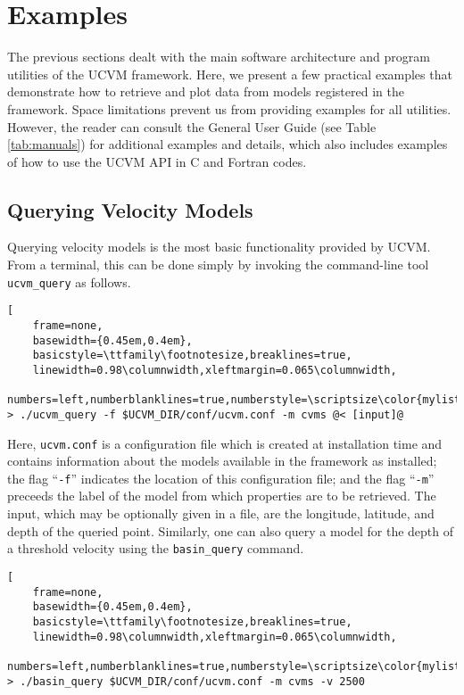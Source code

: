 
\section{Examples}

The previous sections dealt with the main software architecture and program utilities of the UCVM framework. Here, we present a few practical examples that demonstrate how to retrieve and plot data from models registered in the framework. Space limitations prevent us from providing examples for all utilities. However, the reader can consult the General User Guide (see Table \ref{tab:manuals}) for additional examples and details, which also includes examples of how to use the UCVM API in C and Fortran codes.

\subsection{Querying Velocity Models}

Querying velocity models is the most basic functionality provided by UCVM. From a terminal, this can be done simply by invoking the command-line tool \texttt{ucvm\_query} as follows.

\begin{lstlisting}[
	frame=none,
	basewidth={0.45em,0.4em},
	basicstyle=\ttfamily\footnotesize,breaklines=true,
	linewidth=0.98\columnwidth,xleftmargin=0.065\columnwidth,
	numbers=left,numberblanklines=true,numberstyle=\scriptsize\color{mylistingnclr},style=optional]
> ./ucvm_query -f $UCVM_DIR/conf/ucvm.conf -m cvms @< [input]@
\end{lstlisting}

\noindent
Here, \texttt{ucvm.conf} is a configuration file which is created at installation time and contains information about the models available in the framework as installed; the flag ``\texttt{-f}'' indicates the location of this configuration file; and the flag ``\texttt{-m}'' preceeds the label of the model from which properties are to be retrieved. The input, which may be optionally given in a file, are the longitude, latitude, and depth of the queried point. Similarly, one can also query a model for the depth of a threshold velocity using the \texttt{basin\_query} command.

\begin{lstlisting}[
	frame=none,
	basewidth={0.45em,0.4em},
	basicstyle=\ttfamily\footnotesize,breaklines=true,
	linewidth=0.98\columnwidth,xleftmargin=0.065\columnwidth,
	numbers=left,numberblanklines=true,numberstyle=\scriptsize\color{mylistingnclr}]
> ./basin_query $UCVM_DIR/conf/ucvm.conf -m cvms -v 2500
\end{lstlisting}

